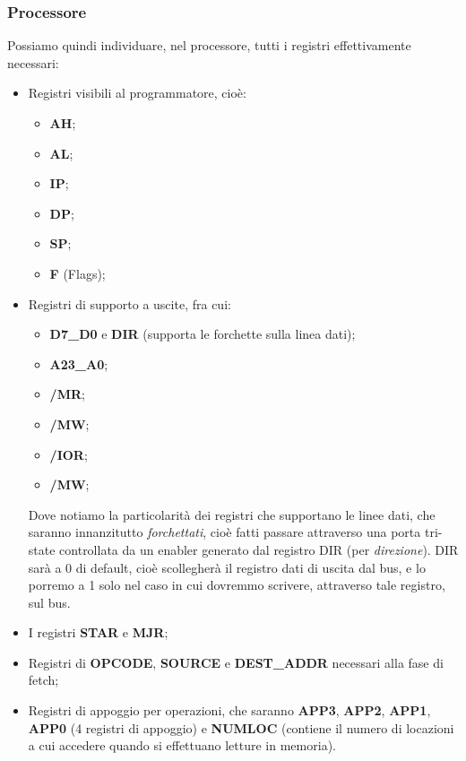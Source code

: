 \documentclass[a4paper,11pt]{article}
\begin{document}
\subsubsection{Processore}
Possiamo quindi individuare, nel processore, tutti i registri effettivamente necessari:
\begin{itemize}
	\item Registri visibili al programmatore, cioè:
		\begin{itemize}
			\item \textbf{AH};
			\item \textbf{AL};
			\item \textbf{IP};
			\item \textbf{DP};
			\item \textbf{SP};
			\item \textbf{F} (Flags);
		\end{itemize}
	\item Registri di supporto a uscite, fra cui:
		\begin{itemize}
			\item \textbf{D7\_D0} e \textbf{DIR} (supporta le forchette sulla linea dati);
			\item \textbf{A23\_A0};
			\item \textbf{/MR};
			\item \textbf{/MW};
			\item \textbf{/IOR};
			\item \textbf{/MW};
		\end{itemize}
		Dove notiamo la particolarità dei registri che supportano le linee dati, che saranno innanzitutto \textit{forchettati}, cioè fatti passare attraverso una porta tri-state controllata da un enabler generato dal registro DIR (per \textit{direzione}).
		DIR sarà a 0 di default, cioè scollegherà il registro dati di uscita dal bus, e lo porremo a 1 solo nel caso in cui dovremmo scrivere, attraverso tale registro, sul bus.
	\item I registri \textbf{STAR} e \textbf{MJR};
	\item Registri di \textbf{OPCODE}, \textbf{SOURCE} e \textbf{DEST\_ADDR} necessari alla fase di fetch;
	\item Registri di appoggio per operazioni, che saranno \textbf{APP3}, \textbf{APP2}, \textbf{APP1}, \textbf{APP0} (4 registri di appoggio) e \textbf{NUMLOC} (contiene il numero di locazioni a cui accedere quando si effettuano letture in memoria).
\end{itemize}
\end{document}
